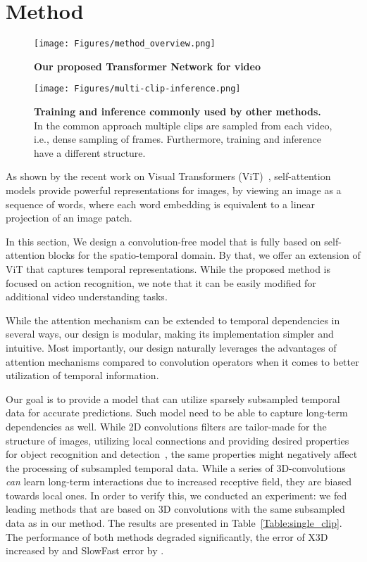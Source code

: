\documentclass[10pt,twocolumn,letterpaper]{article}
\begin{document}
 

\section{Method}

\begin{figure} [t!]
  \centering
  \texttt{[image: Figures/method\_overview.png]}
  \caption{\textbf{Our proposed  Transformer Network for video}}
  \label{fig:overview}
\end{figure} 
\medskip
\medskip

\begin{figure*} [ht!]
  \centering
  \texttt{[image: Figures/multi-clip-inference.png]}
  \caption{\textbf{Training and inference commonly used by other methods.} In the common approach multiple clips are sampled from each video, i.e., dense sampling of frames. Furthermore, training and inference have a different structure.}
  \label{fig:multi-clip-sampling}
\end{figure*} 
\medskip
\medskip


As shown by the recent work on Visual Transformers (ViT)~\cite{dosovitskiy2021an}, self-attention models provide powerful representations for images, by viewing an image as a sequence of words, where each word embedding is equivalent to a linear projection of an image patch. 

In this section, We design a convolution-free model that is fully based on self-attention blocks for the spatio-temporal domain. By that, we offer an extension of ViT that captures temporal representations. While the proposed method is  focused on action recognition, we note that it can be easily modified for additional video understanding tasks.  

While the attention mechanism can be extended to temporal dependencies in several ways, 
our design is modular, making its implementation simpler and intuitive. 
Most importantly, our design naturally leverages the advantages of attention mechanisms compared to convolution operators when it comes to better utilization of temporal information. 

Our goal is to provide a model that can utilize sparsely subsampled temporal data for accurate predictions. Such model need to be able to capture long-term dependencies as well. 
While 2D convolutions filters are tailor-made for the structure of images, utilizing local connections and providing desired properties for object recognition and detection~\cite{kauderer2017quantifying}, the same properties might negatively affect the processing of subsampled temporal data. While a series of 3D-convolutions \textit{can} learn long-term interactions due to increased receptive field, they are biased towards local ones.  
In order to verify this, we conducted an experiment: we fed leading methods that are based on 3D convolutions with the same subsampled data as in our method. The results are presented in Table~\ref{Table:single_clip}. The performance of both methods degraded significantly, 
the error of X3D increased by    and SlowFast error by .
\end{document}
